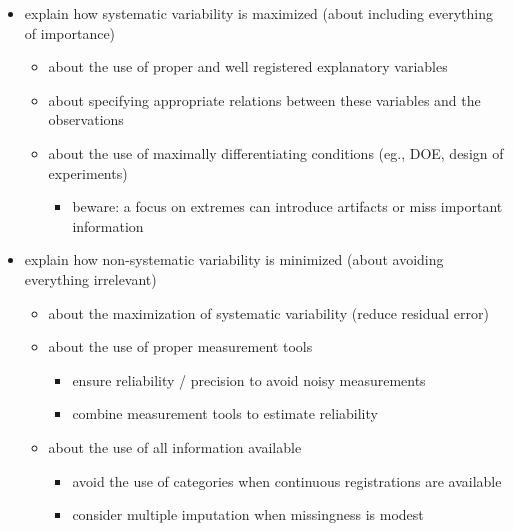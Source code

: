 \documentclass[]{article}
\providecommand{\tightlist}{%
  \setlength{\itemsep}{0pt}\setlength{\parskip}{0pt}}
\begin{document}
\begin{itemize}
\tightlist
\item
  explain how systematic variability is maximized (about including
  everything of importance)

  \begin{itemize}
  \tightlist
  \item
    about the use of proper and well registered explanatory variables
  \item
    about specifying appropriate relations between these variables and
    the observations
  \item
    about the use of maximally differentiating conditions (eg., DOE,
    design of experiments)

    \begin{itemize}
    \tightlist
    \item
      beware: a focus on extremes can introduce artifacts or miss
      important information \\
    \end{itemize}
  \end{itemize}
\item
  explain how non-systematic variability is minimized (about avoiding
  everything irrelevant)

  \begin{itemize}
  \tightlist
  \item
    about the maximization of systematic variability (reduce residual
    error)
  \item
    about the use of proper measurement tools

    \begin{itemize}
    \tightlist
    \item
      ensure reliability / precision to avoid noisy measurements
    \item
      combine measurement tools to estimate reliability
    \end{itemize}
  \item
    about the use of all information available

    \begin{itemize}
    \tightlist
    \item
      avoid the use of categories when continuous registrations are
      available
    \item
      consider multiple imputation when missingness is modest
    \end{itemize}
  \end{itemize}
\end{itemize}
\end{document}
